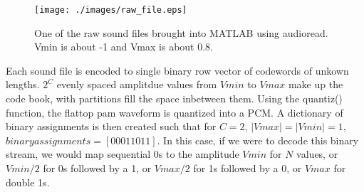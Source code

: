 \documentclass[letterpaper,12pt]{article}
\begin{document}

\begin{figure}[h]
 \centering
 \texttt{[image: ./images/raw\_file.eps]}
 \caption{One of the raw sound files brought into MATLAB using audioread. Vmin is about -1 and Vmax is about 0.8.}\label{f:raw}
\end{figure}


Each sound file is encoded to single binary row vector of codewords of unkown lengths. $2^C$ evenly spaced amplitdue values from $Vmin$ to $Vmax$ make up the code book, with partitions fill the space inbetween them. Using the quantiz() function, the flattop pam waveform is quantized into a PCM. A dictionary of binary assignments is then created such that for $C=2$, $|Vmax|=|Vmin|=1$, $binary assignments = [00 01 10 11]$. In this case, if we were to decode this binary stream, we would map sequential 0s to the amplitude $Vmin$ for $N$ values, or $Vmin/2$ for 0s followed by a 1, or $Vmax/2$ for 1s followed by a 0, or $Vmax$ for double 1s. 
\end{document}
